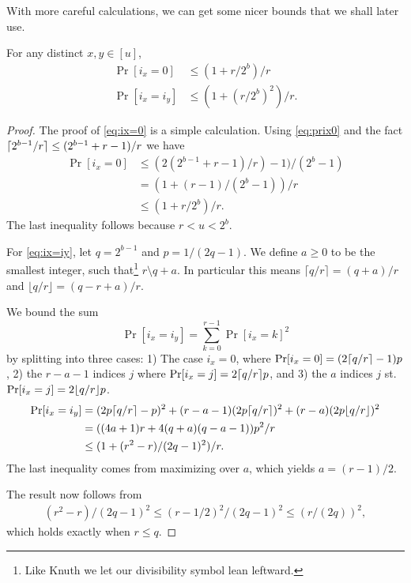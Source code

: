 With more careful calculations, we can get some nicer bounds that we shall later use.
\begin{lemma}
   \label{lem:ix-r-dist}
   For any distinct $x,y\in [u]$,
   \begin{align}
      \Pr[i_x=0] & \le(1+r/2^b)/r\label{eq:ix=0} \\ \Pr[i_x=i_y] & \leq \left(1+(r/2^b)^2\right)/r.
      \label{eq:ix=iy}
   \end{align}
\end{lemma}
\begin{proof}
   The proof of \eqref{eq:ix=0} is a simple calculation.
   Using \eqref{eq:prix0} and the fact $\lceil {2^{b-1}/r}\rceil\le(2^{b-1}+r-1)/r$ we have
   \begin{align*}
      \Pr[i_x=0] & \le (2(2^{b-1}+r-1)/r)-1)/(2^{b}-1) \\    & =\left(1+(r-1)/(2^b-1)\right)/r\\   & \le\left(1+r/2^b\right)/r.
   \end{align*}
   The last inequality follows because $r<u<2^b$.

   For \ref{eq:ix=iy}, let $q=2^{b-1}$ and $p=1/(2q-1)$.
   We define $a\ge 0$ to be the smallest integer, such that\footnote{Like Knuth we let our divisibility symbol lean leftward.} $r\setminus q+a$.
   In particular this means $\lceil q/r\rceil = (q+a)/r$ and $\lfloor q/r\rfloor = (q-r+a)/r$.

   We bound the sum $$ \Pr[i_x=i_y] = \sum_{k=0}^{r-1} \Pr[i_x = k]^2 $$ by splitting into three cases: 1) The case $i_x=0$, where $\Pr[i_x=0]=(2\lceil {q/r}\rceil-1)p$, 2) the $r-a-1$ indices $j$ where $\Pr[i_x=j]=2\lceil {q/r}\rceil p$, and 3) the $a$ indices $j$ st.
   $\Pr[i_x=j]=2\lfloor {q/r} \rfloor p$.
   \begin{align*}
      \Pr[i_x=i_y]
       & =
      (2p\lceil { q/r}\rceil-p)^2 + (r-a-1) (2p \lceil q/r\rceil)^2 + (r-a) (2p \lfloor q/r \rfloor)^2
      \\  & = ((4a+1)r+4(q+a)(q-a-1))p^2/r
      \\  & \le (1 + (r^2-r)/(2q-1)^2) / r.
   \end{align*}
   The last inequality comes from maximizing over $a$, which yields $a=(r-1)/2$.

   The result now follows from
   \begin{align}
      (r^2-r)/(2q-1)^2 \le (r-1/2)^2/(2q-1)^2 \le (r/(2q))^2,
   \end{align}
   which holds exactly when $r\le q$.

\end{proof}
